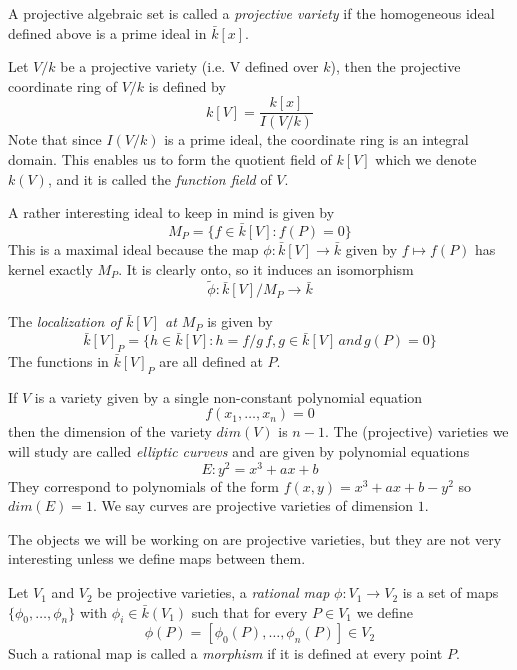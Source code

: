 \begin{mydef}
 A projective algebraic set is called a \emph{projective variety} if the homogeneous
ideal defined above is a prime ideal in $\bar{k}[x]$.
\end{mydef}

\begin{mydef}
 Let $V/k$ be a projective variety (i.e. V defined over $k$), then the projective coordinate
ring of $V/k$ is defined by
$$ k[V] = \frac{k[x]}{I(V/k)}$$
Note that since $I(V/k)$ is a prime ideal, the coordinate ring is an integral domain.
This enables us to form the quotient field of $k[V]$ which we denote $k(V)$, and it is called
the \emph{function field} of $V$.
\end{mydef}

A rather interesting ideal to keep in mind is given by
$$ M_P = \{ f\in \bar{k}[V] : f(P)=0 \} $$
This is a maximal ideal because the map $\phi: \bar{k}[V] \rightarrow \bar{k}$ given by
$ f \mapsto f(P) $ has kernel exactly $M_P$. It is clearly onto, so it induces an
isomorphism $$\tilde{\phi}: \bar{k}[V]/M_P \rightarrow \bar{k} $$

\begin{mydef}
 The \emph{localization of $\bar{k}[V]$ at $M_P$} is given by
$$ \bar{k}[V]_P = \{ h \in \bar{k}[V] : h = f/g\, f,g\in \bar{k}[V]\, and\, g(P)=0 \} $$
The functions in $\bar{k}[V]_P$ are all defined at $P$.
\end{mydef}

\begin{ex}
 If $V$ is a variety given by a single non-constant polynomial equation
$$f(x_1,\ldots,x_n) = 0$$ 
then the dimension of the variety $dim(V)$ is $n-1$. The (projective) varieties
we will study are called \emph{elliptic curvevs} and are
given by polynomial equations
$$E: y^2 = x^3+ax+b$$
They correspond to polynomials of the form $f(x,y) = x^3+ax+b-y^2$ so $dim(E)=1$.
We say curves are projective varieties of dimension $1$.
\end{ex}

The objects we will be working on are projective varieties, but they are not
very interesting unless we define maps between them.

\begin{mydef}
 Let $V_1$ and $V_2$ be projective varieties, a \emph{rational map} $\phi: V_1 \rightarrow V_2$
is a set of maps $\{\phi_0,\ldots,\phi_n\}$ with $\phi_i \in \bar{k}(V_1)$ such that for every
$P\in V_1$ we define
$$\phi(P) = [\phi_0(P),\ldots,\phi_n(P)] \in V_2$$
Such a rational map is called a \emph{morphism} if it is defined at every point $P$.
\end{mydef}


